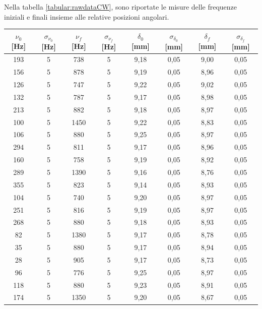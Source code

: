 \documentclass{article}
\begin{document}
            Nella tabella \ref{tabular:rawdataCW}, sono riportate le misure delle frequenze iniziali e finali insieme alle relative posizioni angolari. \\

            \begin{table}[H]

                \centering
                \begin{tabular}{c c c c c c c c} 

                    \toprule
                    $\nu_0$ [Hz] & $\sigma_{\nu_0}$ [Hz] & $\nu_f$ [Hz] &  $\sigma_{\nu_f}$ [Hz] & 
                    $\delta_0$ [mm] & $\sigma_{\delta_0}$ [mm] & $\delta_f$ [mm] & $\sigma_{\delta_f}$ [mm] \\ 
                    
                    \midrule
                    193 & 5 & 738   & 5 & 9,18 & 0,05 & 9,00 & 0,05  \\ 
                    156 & 5 & 878   & 5 & 9,19 & 0,05 & 8,96 & 0,05  \\ 
                    126 & 5 & 747   & 5 & 9,22 & 0,05 & 9,02 & 0,05  \\ 
                    132 & 5 & 787   & 5 & 9,17 & 0,05 & 8,98 & 0,05  \\ 
                    213 & 5 & 882   & 5 & 9,18 & 0,05 & 8,97 & 0,05  \\ 
                    100 & 5 & 1450  & 5 & 9,22 & 0,05 & 8,83 & 0,05  \\ 
                    106 & 5 & 880   & 5 & 9,25 & 0,05 & 8,97 & 0,05  \\ 
                    294 & 5 & 811   & 5 & 9,17 & 0,05 & 8,96 & 0,05  \\ 
                    160 & 5 & 758   & 5 & 9,19 & 0,05 & 8,92 & 0,05  \\ 
                    289 & 5 & 1390  & 5 & 9,16 & 0,05 & 8,76 & 0,05  \\ 
                    355 & 5 & 823   & 5 & 9,14 & 0,05 & 8,93 & 0,05  \\ 
                    104 & 5 & 740   & 5 & 9,20 & 0,05 & 8,97 & 0,05  \\ 
                    251 & 5 & 816   & 5 & 9,19 & 0,05 & 8,97 & 0,05  \\ 
                    268 & 5 & 880   & 5 & 9,18 & 0,05 & 8,93 & 0,05  \\ 
                    82  & 5 & 1380  & 5 & 9,17 & 0,05 & 8,78 & 0,05  \\ 
                    35  & 5 & 880   & 5 & 9,17 & 0,05 & 8,94 & 0,05  \\ 
                    28  & 5 & 905   & 5 & 9,17 & 0,05 & 8,73 & 0,05  \\ 
                    96  & 5 & 776   & 5 & 9,25 & 0,05 & 8,97 & 0,05  \\ 
                    118 & 5 & 880   & 5 & 9,23 & 0,05 & 8,91 & 0,05  \\ 
                    174 & 5 & 1350  & 5 & 9,20 & 0,05 & 8,67 & 0,05  \\ 
            

\end{tabular}
\end{table}
\end{document}
